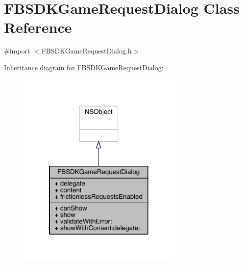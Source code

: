 \hypertarget{interface_f_b_s_d_k_game_request_dialog}{\section{F\-B\-S\-D\-K\-Game\-Request\-Dialog Class Reference}
\label{interface_f_b_s_d_k_game_request_dialog}
}


{\ttfamily \#import $<$F\-B\-S\-D\-K\-Game\-Request\-Dialog.\-h$>$}



Inheritance diagram for F\-B\-S\-D\-K\-Game\-Request\-Dialog\-:
\nopagebreak
\begin{figure}[H]
\begin{center}
\leavevmode
\includegraphics[width=230pt]{interface_f_b_s_d_k_game_request_dialog__inherit__graph}
\end{center}
\end{figure}


